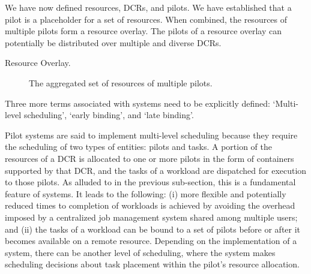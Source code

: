 \documentclass{sig-alternate}
\begin{document}


We have now defined resources, DCRs, and pilots. We have established that a
pilot is a placeholder for a set of resources. When combined, the resources of
multiple pilots form a resource overlay. The pilots of a resource overlay can
potentially be distributed over multiple and diverse DCRs.


\begin{description}
\item[Resource Overlay.] The aggregated set of resources of multiple pilots.
\end{description}

Three more terms associated with \pilot systems need to be explicitly defined:
`Multi-level scheduling', `early binding', and `late binding'.

Pilot systems are said to implement multi-level scheduling because they require
the scheduling of two types of entities: pilots and tasks.   A portion of the resources of a DCR is allocated to
one or more pilots in the form of containers supported by that DCR, and the
tasks of a workload are dispatched for execution to those pilots. As alluded to
in the previous sub-section, this is a fundamental feature of \pilot systems.
It leads to the following: (i) more flexible and potentially reduced times to
completion of workloads is achieved by avoiding the overhead imposed by a
centralized job management system shared among multiple users; and (ii) the
tasks of a workload can be bound to a set of pilots before or after it becomes
available on a remote resource. Depending on the implementation of a \pilot
system, there can be another level of scheduling, where the \pilot system makes
scheduling decisions about task placement within the pilot's resource
allocation.
\end{document}
